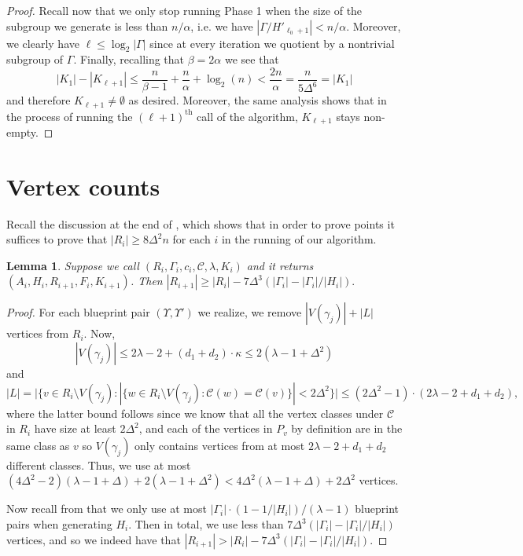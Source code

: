 \documentclass{article}
\newcommand{\cC}{\mathcal{C} }
\newtheorem{lemma}[theorem]{Lemma}
\theoremstyle{definition}
\begin{document}
\begin{proof}
Recall now that we only stop running Phase 1 when the size of the subgroup we generate is less than $ n/\alpha$, i.e. we have $|\Gamma/H'_{\ell_0+1}|< n/\alpha$. Moreover, we clearly have $\ell\leq \log_2 |\Gamma|$ since at every iteration we quotient by a nontrivial subgroup of $\Gamma$. Finally, recalling that $\beta=2\alpha$ we see that
$$|K_1|-|K_{\ell+1}|\leq \frac{n}{\beta-1}+\frac{n}{\alpha} +\log_2(n)< \frac{2n}{\alpha}=\frac{n}{5\Delta^6}=|K_1|$$ and therefore $K_{\ell+1}\neq\emptyset$ as desired. Moreover, the same analysis shows that in the process of running the $(\ell+1)^\text{th}$ call of the algorithm, $K_{\ell+1}$ stays non-empty.
\end{proof}

\section{Vertex counts}\label{Sec.vertexcounts}

Recall the discussion at the end of , which shows that in order to prove points  it suffices to prove that $|R_i|\geq 8\Delta^2n$ for each $i$ in the running of our algorithm.

\begin{lemma} \label{vertex_step}
Suppose we call   $(R_i,\Gamma_i,c_i,\cC,\lambda, K_i)$ and it returns $(A_i,H_i,R_{i+1},F_i,K_{i+1})$. Then $|R_{i+1}|\geq |R_i| - 7\Delta^3 (|\Gamma_i|-|\Gamma_i|/|H_i|).$
\end{lemma}

\begin{proof}
    For each blueprint pair $(\Upsilon,\Upsilon')$ we realize, we remove $|V(\gamma_j)| + |L|$ vertices from $R_i$. Now,
    \[|V(\gamma_j)|\le 2\lambda -2 + (d_1+d_2)\cdot \kappa\leq 2(\lambda-1+\Delta^2)\]
    and
    \[|L|=\big|\{v\in R_i\setminus V(\gamma_j):|\{w\in R_i\setminus V(\gamma_j):\cC(w)=\cC(v)\} | <2\Delta^2\}\big|\leq (2\Delta^2-1) \cdot (2\lambda-2+d_1+d_2),\] 
    where the latter bound follows since we know that all the vertex classes under $\cC$ in $R_i$ have size at least $2\Delta^2$, and each of the vertices in $P_v$ by definition are in the same class as $v$ so $V(\gamma_j)$ only contains vertices from at most $2\lambda-2+d_1+d_2$ different classes. Thus, we use at most $(4\Delta^2-2)(\lambda-1 +\Delta) + 2(\lambda - 1 +\Delta^2) < 4\Delta^2(\lambda-1+\Delta)+2\Delta^2$ vertices.

    Now recall from  that we only use at most $|\Gamma_i|\cdot(1-1/|H_i|)/(\lambda -1)$ blueprint pairs when generating $H_i$. Then in total, we use less than $7\Delta^3(|\Gamma_i|-|\Gamma_i|/|H_i|)$ vertices, and so we indeed have that $|R_{i+1}|>|R_i|-7\Delta^3(|\Gamma_i|-|\Gamma_i|/|H_i|).$
\end{proof}
\end{document}
